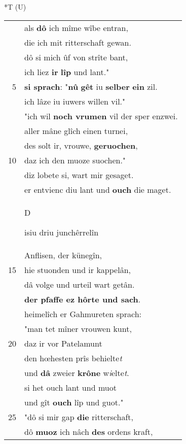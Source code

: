 \documentclass[8pt,a4paper,notitlepage]{article}
\begin{document}
\begin{table}[ht]
\begin{minipage}[t]{0.5\linewidth}
\end{minipage}
\hspace{0.5cm}
\begin{minipage}[t]{0.5\linewidth}
\small
\begin{center}*T (U)
\end{center}
\begin{tabular}{rl}
 & als \textbf{dô} ich mîme wîbe entran,\\ 
 & die ich mit ritterschaft gewan.\\ 
 & dô si mich ûf von strîte bant,\\ 
 & ich liez \textbf{ir} \textbf{lîp} und lant."\\ 
5 & \textbf{si sprach}: "\textbf{nû} \textbf{gêt} iu \textbf{selber} \textbf{ein} zil.\\ 
 & ich lâze iu iuwers willen vil."\\ 
 & "ich wil \textbf{noch vrumen} vil der sper enzwei.\\ 
 & aller mâne glîch einen turnei,\\ 
 & des solt ir, vrouwe, \textbf{geruochen},\\ 
10 & daz ich den muoze suochen."\\ 
 & diz lobete si, wart mir gesaget.\\ 
 & er entvienc diu lant und \textbf{ouch} die maget.\\ 
 & \begin{large}D\end{large}isiu driu junchêrrelîn\\ 
 & Anflisen, der künegîn,\\ 
15 & hie stuonden und ir kappelân,\\ 
 & dâ volge und urteil wart getân.\\ 
 & \textbf{der pfaffe ez hôrte und sach}.\\ 
 & heimelîch er Gahmureten sprach:\\ 
 & "man tet mîner vrouwen kunt,\\ 
20 & daz ir vor Patelamunt\\ 
 & den hœhesten prîs behielte\textit{t}\\ 
 & und \textbf{dâ} zweier \textbf{krône} w\textit{i}elte\textit{t}.\\ 
 & si het ouch lant und muot\\ 
 & und gît \textbf{ouch} lîp und guot."\\ 
25 & "dô si mir gap \textbf{die} ritterschaft,\\ 
 & dô \textbf{muoz} ich nâch \textbf{des} ordens kraft,\\ 

\end{tabular}
\end{minipage}
\end{table}
\end{document}
